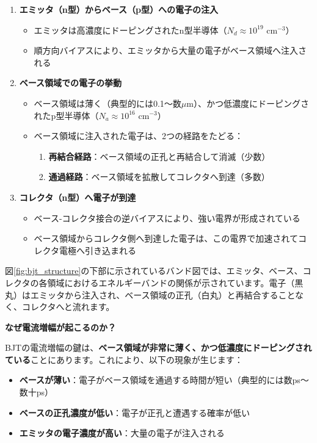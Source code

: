 \begin{enumerate}
\item \textbf{エミッタ（n型）からベース（p型）への電子の注入}
\begin{itemize}
\item エミッタは高濃度にドーピングされたn型半導体（$N_d \approx 10^{19}$ cm$^{-3}$）
\item 順方向バイアスにより、エミッタから大量の電子がベース領域へ注入される
\end{itemize}

\item \textbf{ベース領域での電子の挙動}
\begin{itemize}
\item ベース領域は薄く（典型的には0.1〜数$\mu$m）、かつ低濃度にドーピングされたp型半導体（$N_a \approx 10^{16}$ cm$^{-3}$）
\item ベース領域に注入された電子は、2つの経路をたどる：
\begin{enumerate}
\item \textbf{再結合経路}：ベース領域の正孔と再結合して消滅（少数）
\item \textbf{通過経路}：ベース領域を拡散してコレクタへ到達（多数）
\end{enumerate}
\end{itemize}

\item \textbf{コレクタ（n型）へ電子が到達}
\begin{itemize}
\item ベース-コレクタ接合の逆バイアスにより、強い電界が形成されている
\item ベース領域からコレクタ側へ到達した電子は、この電界で加速されてコレクタ電極へ引き込まれる
\end{itemize}
\end{enumerate}

図\ref{fig:bjt_structure}の下部に示されているバンド図では、エミッタ、ベース、コレクタの各領域におけるエネルギーバンドの関係が示されています。電子（黒丸）はエミッタから注入され、ベース領域の正孔（白丸）と再結合することなく、コレクタへと流れます。

\textbf{なぜ電流増幅が起こるのか？}

BJTの電流増幅の鍵は、\textbf{ベース領域が非常に薄く、かつ低濃度にドーピングされている}ことにあります。これにより、以下の現象が生じます：

\begin{itemize}
\item \textbf{ベースが薄い}：電子がベース領域を通過する時間が短い（典型的には数ps〜数十ps）
\item \textbf{ベースの正孔濃度が低い}：電子が正孔と遭遇する確率が低い
\item \textbf{エミッタの電子濃度が高い}：大量の電子が注入される
\end{itemize}

